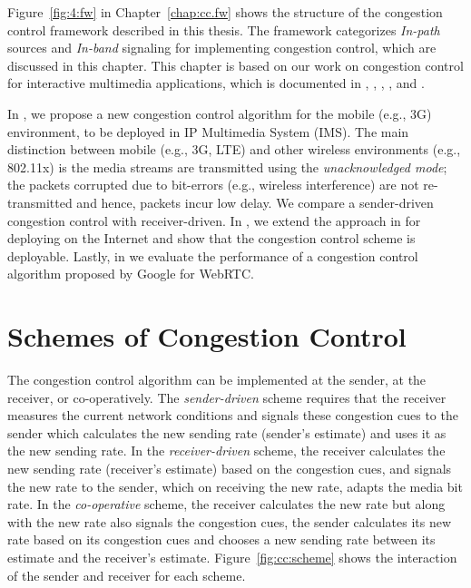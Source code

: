 Figure~\ref{fig:4:fw} in Chapter~\ref{chap:cc.fw} shows the structure of the
congestion control framework described in this thesis. The framework
categorizes \emph{In-path} sources and \emph{In-band} signaling for
implementing congestion control, which are discussed in this chapter. This
chapter is based on our work on congestion control for interactive multimedia
applications, which is documented in , ,
, \cite{draft.xr.discard.rle}, \cite{draft.xr.bytes.discarded}
and \cite{Singh:control.loops.api}.

In , we propose a new congestion control algorithm for the
mobile (e.g., 3G) environment, to be deployed in IP Multimedia System (IMS).
The main distinction between mobile (e.g., 3G, LTE) and other wireless
environments (e.g., 802.11x) is the media streams are transmitted using the
\emph{unacknowledged mode}; the packets corrupted due to bit-errors (e.g.,
wireless interference) are not re-transmitted and hence, packets incur low
delay. We compare a sender-driven congestion control with receiver-driven. In
, we extend the approach in  for deploying on
the Internet and show that the congestion control scheme is deployable.
Lastly, in  we evaluate the performance of a congestion
control algorithm proposed by Google for WebRTC.

\section{Schemes of Congestion Control}

The congestion control algorithm can be implemented at the sender, at the
receiver, or co-operatively. The \emph{sender-driven} scheme requires that the
receiver measures the current network conditions and signals these congestion
cues to the sender which calculates the new sending rate (sender's estimate)
and uses it as the new sending rate. In the \emph{receiver-driven} scheme, the
receiver calculates the new sending rate (receiver's estimate) based on the
congestion cues, and signals the new rate to the sender, which on receiving
the new rate, adapts the media bit rate. In the \emph{co-operative} scheme,
the receiver calculates the new rate but along with the new rate also signals
the congestion cues, the sender calculates its new rate based on its
congestion cues and chooses a new sending rate between its estimate and the
receiver's estimate. Figure~\ref{fig:cc:scheme} shows the interaction of the
sender and receiver for each scheme.

